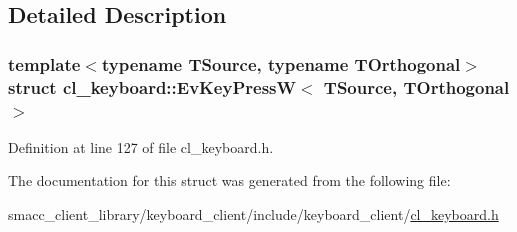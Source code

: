 \subsection{Detailed Description}
\subsubsection*{template$<$typename T\+Source, typename T\+Orthogonal$>$\newline
struct cl\+\_\+keyboard\+::\+Ev\+Key\+Press\+W$<$ T\+Source, T\+Orthogonal $>$}



Definition at line 127 of file cl\+\_\+keyboard.\+h.



The documentation for this struct was generated from the following file\+:\begin{DoxyCompactItemize}
\item 
smacc\+\_\+client\+\_\+library/keyboard\+\_\+client/include/keyboard\+\_\+client/\hyperlink{cl__keyboard_8h}{cl\+\_\+keyboard.\+h}\end{DoxyCompactItemize}

